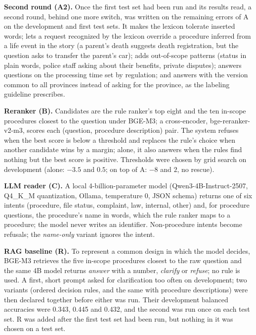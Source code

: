 \textbf{Second round (A2).} Once the first test set had been run and its results read, a second round, behind one more switch, was written
on the remaining errors of A on the development and first test sets. It makes the lexicon tolerate inserted words; lets a request
recognized by the lexicon override a procedure inferred from a life event in the story (a parent's death suggests death registration, but
the question asks to transfer the parent's car); adds out-of-scope patterns (status in plain words, police staff asking about their benefits,
private disputes); answers questions on the processing time set by regulation;
and answers with the version common to all provinces instead of asking for the province, as the labeling guideline prescribes.

\textbf{Reranker (B).} Candidates are the rule ranker's top eight and the ten in-scope procedures closest to the question under
BGE-M3\cite{chen2024m3}; a cross-encoder, bge-reranker-v2-m3\cite{bgererank}, scores each (question, procedure description) pair. The
system refuses when the best score is below a threshold and replaces the rule's choice when another candidate wins by a margin; alone, it
also answers when the rules find nothing but the best score is positive. Thresholds were chosen by grid search on development (alone:
$-3.5$ and $0.5$; on top of A: $-8$ and $2$, no rescue).

\textbf{LLM reader (C).} A local 4-billion-parameter model (Qwen3-4B-Instruct-2507, Q4\_K\_M quantization, Ollama, temperature 0, JSON
schema)\cite{qwen3,qwen3inst} returns one of six intents (procedure, file status, complaint, law, internal, other) and, for procedure
questions, the procedure's name in words, which the rule ranker maps to a procedure; the model never writes an identifier. Non-procedure
intents become refusals; the \emph{name-only} variant ignores the intent.

\textbf{RAG baseline (R).} To represent a common design in which the model decides, BGE-M3 retrieves the five in-scope procedures closest to
the raw question and the same 4B model returns \emph{answer} with a number, \emph{clarify} or \emph{refuse}; no rule is used. A first, short
prompt asked for clarification too often on development; two variants (ordered decision rules, and the same with procedure descriptions)
were then declared together before either was run. Their development balanced accuracies were 0.343, 0.445 and 0.432, and the second was
run once on each test set. R was added after the first test set had been run, but nothing in it was chosen on a test set.
